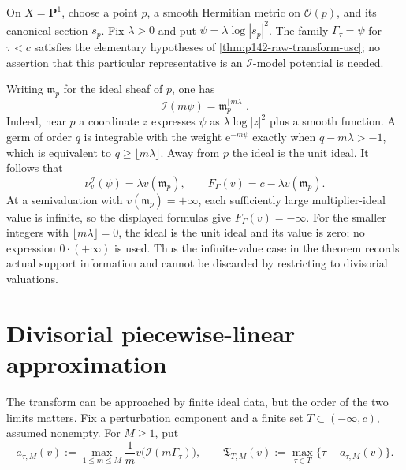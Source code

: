 \begin{example}\label{ex:p142-infinite-ideal-value}
On $X=\mathbf P^1$, choose a point $p$, a smooth Hermitian metric on
$\mathcal O(p)$, and its canonical section $s_p$. Fix $\lambda>0$ and
put $\psi=\lambda\log|s_p|^2$. The family $\Gamma_\tau=\psi$ for
$\tau<c$ satisfies the elementary hypotheses of
\cref{thm:p142-raw-transform-usc}; no assertion that this particular
representative is an $\mathcal I$-model potential is needed.

Writing $\mathfrak m_p$ for the ideal sheaf of $p$, one has
\[
       \mathcal I(m\psi)=\mathfrak m_p^{\lfloor m\lambda\rfloor}.
\]
Indeed, near $p$ a coordinate $z$ expresses $\psi$ as
$\lambda\log|z|^2$ plus a smooth function. A germ of order $q$ is
integrable with the weight $\mathrm e^{-m\psi}$ exactly when
$q-m\lambda>-1$, which is equivalent to $q\geq\lfloor m\lambda\rfloor$.
Away from $p$ the ideal is the unit ideal. It follows that
\[
 \nu_v^{\mathcal I}(\psi)=\lambda v(\mathfrak m_p),
 \qquad F_\Gamma(v)=c-\lambda v(\mathfrak m_p).
\]
At a semivaluation with $v(\mathfrak m_p)=+\infty$, each sufficiently
large multiplier-ideal value is infinite, so the displayed formulas give
$F_\Gamma(v)=-\infty$. For the smaller integers with
$\lfloor m\lambda\rfloor=0$, the ideal is the unit ideal and its value
is zero; no expression $0\cdot(+\infty)$ is used. Thus the infinite-value
case in the theorem records actual support information and cannot be
discarded by restricting to divisorial valuations.
\end{example}

\section{Divisorial piecewise-linear approximation}
\label{sec:pseff-ideal-approximation}

The transform can be approached by finite ideal data, but the order of the
two limits matters.  Fix a perturbation component and a finite set
$T\subset(-\infty,c)$, assumed nonempty. For $M\geq1$, put
\[
 a_{\tau,M}(v)
 :=\max_{1\leq m\leq M}
      \frac1m v\bigl(\mathcal I(m\Gamma_\tau)\bigr),
\qquad
 \mathfrak T_{T,M}(v)
 :=\max_{\tau\in T}\{\tau-a_{\tau,M}(v)\}.
\tag{71.36}\label{eq:pseff-finite-ideal-approximant}
\]

